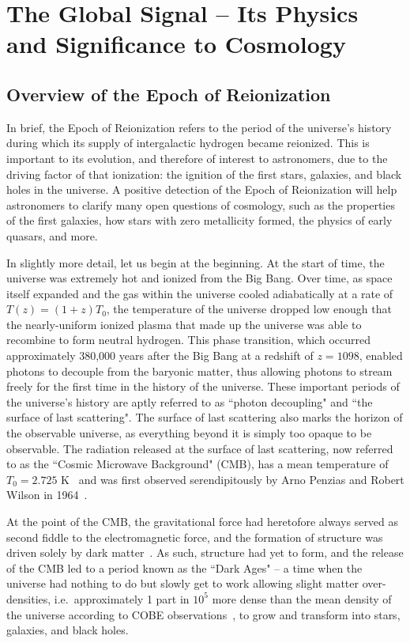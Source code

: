 \chapter{The Global Signal -- Its Physics and Significance to Cosmology}

\section{Overview of the Epoch of Reionization}

In brief, the Epoch of Reionization refers to the period of the universe's 
history during which its supply of intergalactic hydrogen became reionized.  
This is important to its evolution, and therefore of interest to astronomers, 
due to the driving factor of that ionization: the ignition of the first stars, 
galaxies, and black holes in the universe. A positive detection of the Epoch of 
Reionization will help astronomers to clarify many open questions of cosmology, 
such as the properties of the first galaxies, how stars with zero metallicity 
formed, the physics of early quasars, and more.

In slightly more detail, let us begin at the beginning. At the start of time, 
the universe was extremely hot and ionized from the Big Bang. Over time, as 
space itself expanded and the gas within the universe cooled adiabatically
at a rate of $T(z) = (1+z)T_0$, the temperature of the universe dropped low 
enough that the nearly-uniform ionized plasma that made up the universe was 
able to recombine to form neutral hydrogen. This phase transition, which 
occurred approximately 380,000 years after the Big Bang at a redshift of $z = 
1098$, enabled photons to decouple from the baryonic matter, thus allowing 
photons to stream freely for the first time in the history of the universe.  
These important periods of the universe's history are aptly referred to as 
``photon decoupling" and ``the surface of last scattering". The surface of last 
scattering also marks the horizon of the observable universe, as everything 
beyond it is simply too opaque to be observable. The radiation released at the 
surface of last scattering, now referred to as the ``Cosmic Microwave 
Background" (CMB), has a mean temperature of $T_0 = 2.725$ K~\citep{fixsen2009} 
and was first observed serendipitously by Arno Penzias and Robert Wilson in 
1964~\citep{penzias-wilson1965}.  

At the point of the CMB, the gravitational force had heretofore always served 
as second fiddle to the electromagnetic force, and the formation of structure 
was driven solely by dark matter~\citep{zaroubi2012}.  As such, structure had 
yet to form, and the release of the CMB led to a period known as the ``Dark 
Ages" -- a time when the universe had nothing to do but slowly get to work 
allowing slight matter over-densities, i.e.~approximately 1 part in $10^5$ more 
dense than the mean density of the universe according to COBE 
observations~\citep{smoot1992}, to grow and transform into stars, galaxies, and 
black holes.

